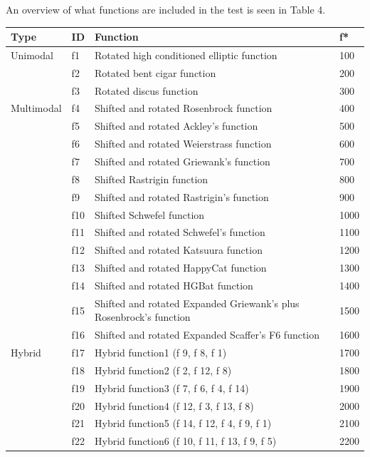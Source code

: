 \clearpage

An overview of what functions are included in the test is seen in Table 4.

\begin{table}[]
\begin{tabular}{llll}
  \textbf{Type}
    & \textbf{ID} & \textbf{Function} & \textbf{f*} \\ \hline
  Unimodal
    & f1 & Rotated high conditioned elliptic function & 100 \\
    & f2 & Rotated bent cigar function & 200 \\
    & f3 & Rotated discus function & 300 \\
  Multimodal
    & f4 & Shifted and rotated Rosenbrock function & 400 \\
    & f5 & Shifted and rotated Ackley's function & 500 \\
    & f6 & Shifted and rotated Weierstrass function & 600 \\
    & f7 & Shifted and rotated Griewank's function & 700 \\
    & f8 & Shifted Rastrigin function & 800 \\
    & f9 & Shifted and rotated Rastrigin's function & 900 \\
    & f10 & Shifted Schwefel function & 1000 \\
    & f11 & Shifted and rotated Schwefel's function & 1100 \\
    & f12 & Shifted and rotated Katsuura function & 1200 \\
    & f13 & Shifted and rotated HappyCat function & 1300 \\
    & f14 & Shifted and rotated HGBat function & 1400 \\
    & f15 & Shifted and rotated Expanded Griewank's plus Rosenbrock's function & 1500 \\
    & f16 & Shifted and rotated Expanded Scaffer's F6 function & 1600 \\
  Hybrid
    & f17 & Hybrid function1 (f 9, f 8, f 1) & 1700 \\
    & f18 & Hybrid function2 (f 2, f 12, f 8) & 1800 \\
    & f19 & Hybrid function3 (f 7, f 6, f 4, f 14) & 1900 \\
    & f20 & Hybrid function4 (f 12, f 3, f 13, f 8) & 2000 \\
    & f21 & Hybrid function5 (f 14, f 12, f 4, f 9, f 1) & 2100 \\
    & f22 & Hybrid function6 (f 10, f 11, f 13, f 9, f 5) & 2200 \\

\end{tabular}
\end{table}
